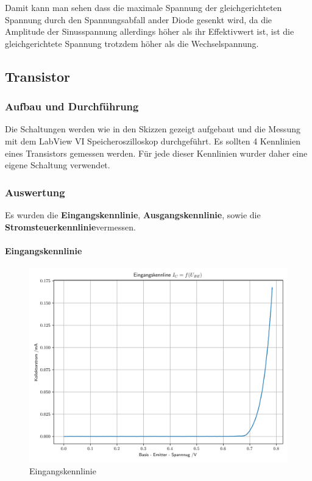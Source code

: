 \documentclass[12pt,twoside,a4paper]{scrartcl}
\begin{document}
			Damit kann man sehen dass die maximale Spannung der gleichgerichteten Spannung durch den Spannungsabfall ander Diode gesenkt wird, da die Amplitude der Sinusspannung allerdings höher als ihr Effektivwert ist, ist die gleichgerichtete Spannung trotzdem höher als die Wechselspannung.


	\subsection{Transistor}
		\subsubsection{Aufbau und Durchführung}
			Die Schaltungen werden wie in den Skizzen gezeigt aufgebaut und die Messung mit dem LabView VI Speicheroszilloskop durchgeführt.
      Es sollten 4 Kennlinien eines Transistors gemessen werden. Für jede dieser Kennlinien wurder daher eine eigene Schaltung verwendet.

		\subsubsection{Auswertung}

        Es wurden die \textbf{Eingangskennlinie}, \textbf{Ausgangskennlinie}, sowie die \textbf{Stromsteuerkennlinie}vermessen.

        \paragraph{Eingangskennlinie}

            \begin{figure}[H]
                \centering
                \includegraphics[width = 0.9 \textwidth]{Plots/Transistor/Einganskennline}
                \caption{Eingangskennlinie}
            \end{figure}
\end{document}
